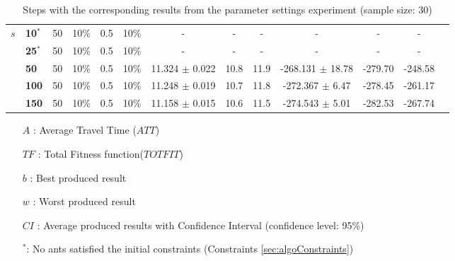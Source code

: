 \begin{sidewaystable}
\begin{tabular}{|l|l|l|l|l|l||c|c|c|c|c|c|c|}
    \hline
    $s$ & \textbf{10$^*$} & 50 & 10\% & 0.5 & 10\% & - & - & - & - & -& - \\
    ~ & \textbf{25$^*$} & 50 & 10\% & 0.5 & 10\% & - & - & - & - & - & -  \\
    ~ & \textbf{50} & 50 & 10\% & 0.5 & 10\% & 11.324 $\pm$ 0.022 & 10.8 & 11.9 & -268.131 $\pm$ 18.78 & -279.70 & -248.58\\
    ~ & \textbf{100} & 50 & 10\% & 0.5 & 10\% & 11.248 $\pm$ 0.019 & 10.7 & 11.8 & -272.367 $\pm$ 6.47 & -278.45 & -261.17\\
    ~ & \textbf{150} & 50 & 10\% & 0.5 & 10\% & 11.158 $\pm$ 0.015 & 10.6 & 11.5 & -274.543 $\pm$ 5.01 & -282.53 & -267.74\\
    \hline
    \end{tabular}
    \caption {Steps with the corresponding results from the parameter settings experiment (sample size: 30)}
    \tiny
    \begin{itemize}[noitemsep]
    \item[$A$ :] Average Travel Time ($ATT$)
    \item[$TF$ :] Total Fitness function($TOTFIT$)
    \item[$b$ :] Best produced result
    \item[$w$ :] Worst produced result
    \item[$CI$ :] Average produced results with Confidence Interval (confidence level: 95\%)
    \item[$^*$:] No ants satisfied the initial constraints (Constraints \vref{sec:algoConstraints})
    \end{itemize}
    \label{table:pm1}
\end{sidewaystable}


